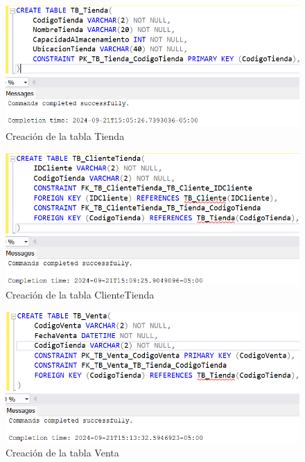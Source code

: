 \begin{figure}[H]
  \centering
  \includegraphics[scale = 0.7]{Imagenes/sql/2.crear_tablas/creacion_tabla_tienda.png}
  \caption{Creación de la tabla Tienda}
\end{figure}

\begin{figure}[H]
  \centering
  \includegraphics[scale = 0.7]{Imagenes/sql/2.crear_tablas/creacion_tabla_clientetienda.png}
  \caption{Creación de la tabla ClienteTienda}
\end{figure}

\begin{figure}[H]
  \centering
  \includegraphics[scale = 0.7]{Imagenes/sql/2.crear_tablas/creacion_tabla_venta.png}
  \caption{Creación de la tabla Venta}
\end{figure}


